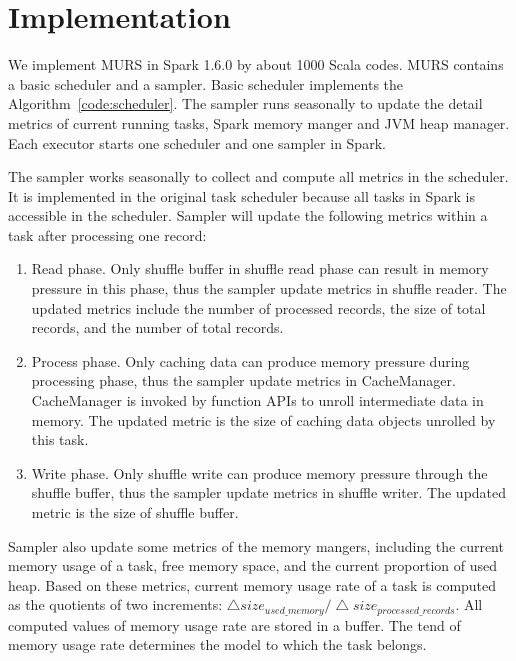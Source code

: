 \section{Implementation}

We implement MURS in Spark 1.6.0 by about 1000 Scala codes. MURS contains a basic scheduler and a sampler. Basic scheduler implements the Algorithm~\ref{code:scheduler}. The sampler runs seasonally to update the detail metrics of current running tasks, Spark memory manger and JVM heap manager. Each executor starts one scheduler and one sampler in Spark.

The sampler works seasonally to collect and compute all metrics in the scheduler. It is implemented in the original task scheduler because all tasks in Spark is accessible in the scheduler. Sampler will update the following metrics within a task after processing one record:

\begin{enumerate}

\item Read phase. Only shuffle buffer in shuffle read phase can result in memory pressure in this phase, thus the sampler update metrics in shuffle reader. The updated metrics include the number of processed records, the size of total records, and the number of total records.

\item Process phase. Only caching data can produce memory pressure during processing phase, thus the sampler update metrics in {\ttfamily \small CacheManager}. {\ttfamily \small CacheManager} is invoked by function APIs to unroll intermediate data in memory. The updated metric is the size of caching data objects unrolled by this task.

\item Write phase. Only shuffle write can produce memory pressure through the shuffle buffer, thus the sampler update metrics in shuffle writer. The updated metric is the size of shuffle buffer. 

\end{enumerate}

Sampler also update some metrics of the memory mangers, including the current memory usage of a task, free memory space, and the current proportion of used heap. Based on these metrics, current memory usage rate of a task is computed as the quotients of two increments: $\bigtriangleup size_{used\_memory} / \bigtriangleup size_{processed\_records}$. All computed values of memory usage rate are stored in a buffer. The tend of memory usage rate determines the model to which the task belongs. 

